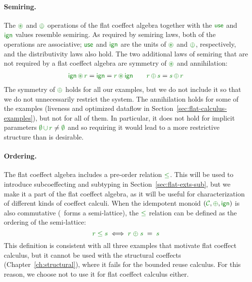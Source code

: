 \paragraph{Semiring.}
The $\cseq$ and $\cpar$ operations of the flat coeffect algebra together with the $\cunit$ and
$\czero$ values resemble semiring. As required by semiring laws, both of the operations are 
associative; $\cunit$ and $\czero$ are the units of $\cseq$ and $\cpar$, respectively, and the
distributivity laws also hold. The two additional laws of semiring that are not required by a 
flat coeffect algebra are symmetry of $\cseq$ and annihilation:
%
\begin{align*}
\czero \, \cseq \, \cclrd{r} = \czero = \cclrd{r} \, \cseq \, \czero \qquad \cclrd{r}\,\cpar\,\cclrd{s} = \cclrd{s}\,\cpar\,\cclrd{r}
\end{align*}
%
The symmetry of $\cpar$ holds for all our examples, but we do not include it so that we do not
unnecessarily restrict the system. The annihilation holds for some of the examples (liveness
and optimized dataflow in Section~\ref{sec:flat-calculus-examples}), but not for all of them.
In particular, it does not hold for implicit parameters $\cclrd{\emptyset}\,\cclrd{\cup}\,\cclrd{r}\neq\cclrd{\emptyset}$
and so requiring it would lead to a more restrictive structure than is desirable.

\paragraph{Ordering.}
The flat coeffect algebra includes a pre-order relation $\cleq$. This will be used to introduce
subcoeffecting and subtyping in Section~\ref{sec:flat-exts-sub}, but we make it a part of the flat
coeffect algebra, as it will be useful for characterization of different kinds of coeffect calculi.
When the idempotent monoid $(\C, \cpar, \czero)$ is also commutative (\ie~forms a
semi-lattice), the $\cleq$ relation can be defined as the ordering of the semi-lattice:
%
\begin{equation*}
\cclrd{r} \;\cleq\; \cclrd{s} \;\Longleftrightarrow\; \cclrd{r} \;\cpar\; \cclrd{s} \;=\; \cclrd{s}
\end{equation*}
%
This definition is consistent with all three examples that motivate flat coeffect calculus, but
it cannot be used with the structural coeffects (Chapter~\ref{ch:structural}), where it fails for
the bounded reuse calculus. For this reason, we choose not to use it for flat coeffect calculus
either.


